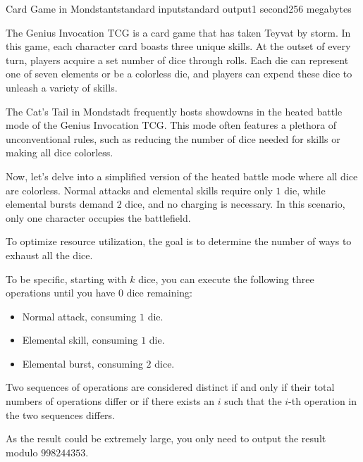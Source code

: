 \begin{problem}{Card Game in Mondstant}{standard input}{standard output}{1 second}{256 megabytes}

The Genius Invocation TCG is a card game that has taken Teyvat by storm. In this game, each character card boasts three unique skills. At the outset of every turn, players acquire a set number of dice through rolls. Each die can represent one of seven elements or be a colorless die, and players can expend these dice to unleash a variety of skills.

The Cat's Tail in Mondstadt frequently hosts showdowns in the heated battle mode of the Genius Invocation TCG. This mode often features a plethora of unconventional rules, such as reducing the number of dice needed for skills or making all dice colorless.

Now, let's delve into a simplified version of the heated battle mode where all dice are colorless. Normal attacks and elemental skills require only $1$ die, while elemental bursts demand $2$ dice, and no charging is necessary. In this scenario, only one character occupies the battlefield.

To optimize resource utilization, the goal is to determine the number of ways to exhaust all the dice.

To be specific, starting with $k$ dice, you can execute the following three operations until you have $0$ dice remaining:

\begin{itemize}
\item Normal attack, consuming $1$ die.
\item Elemental skill, consuming $1$ die.
\item Elemental burst, consuming $2$ dice.
\end{itemize}

Two sequences of operations are considered distinct if and only if their total numbers of operations differ or if there exists an $i$ such that the $i$-th operation in the two sequences differs.

As the result could be extremely large, you only need to output the result modulo $998244353$.



\end{problem}
